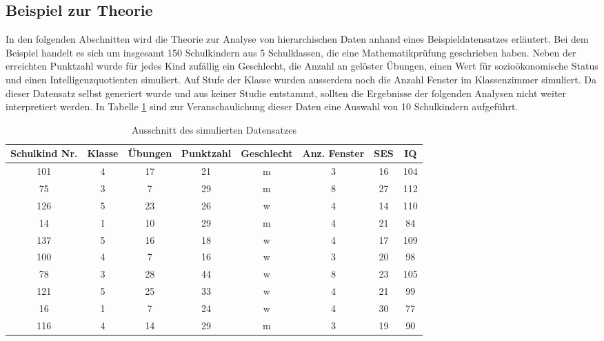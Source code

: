 \documentclass[12pt, a4paper]{article}\usepackage[]{graphicx}\usepackage[]{color}
\begin{document}
\subsection{Beispiel zur Theorie} \label{section:bsp_theorie}
In den folgenden Abschnitten wird die Theorie zur Analyse von hierarchischen Daten anhand eines Beispieldatensatzes erläutert. Bei dem Beispiel handelt es sich um insgesamt 150 Schulkindern aus 5 Schulklassen, die eine Mathematikprüfung geschrieben haben. Neben der erreichten Punktzahl wurde für jedes Kind zufällig ein Geschlecht, die Anzahl an gelöster Übungen, einen Wert für sozioökonomische Status und einen Intelligenzquotienten simuliert. Auf Stufe der Klasse wurden ausserdem noch die Anzahl Fenster im Klassenzimmer simuliert. Da dieser Datensatz selbst generiert wurde und aus keiner Studie entstammt, sollten die Ergebnisse der folgenden Analysen nicht weiter interpretiert werden. In Tabelle \ref{tab:beispiel_theorie} sind zur Veranschaulichung dieser Daten eine Auswahl von 10 Schulkindern aufgeführt.
\begin{table}[t!]
\centering
\begin{threeparttable}
\caption{Ausschnitt des simulierten Datensatzes} 
\begin{tabular}{cccccccc}
  \toprule
 Schulkind Nr. & Klasse & Übungen & Punktzahl & Geschlecht & Anz. Fenster & SES & IQ \\ 
  \midrule
101 & 4 & 17 & 21 & m & 3 & 16 & 104 \\ 
  75 & 3 & 7 & 29 & m & 8 & 27 & 112 \\ 
  126 & 5 & 23 & 26 & w & 4 & 14 & 110 \\ 
  14 & 1 & 10 & 29 & m & 4 & 21 & 84 \\ 
  137 & 5 & 16 & 18 & w & 4 & 17 & 109 \\ 
  100 & 4 & 7 & 16 & w & 3 & 20 & 98 \\ 
  78 & 3 & 28 & 44 & w & 8 & 23 & 105 \\ 
  121 & 5 & 25 & 33 & w & 4 & 21 & 99 \\ 
  16 & 1 & 7 & 24 & w & 4 & 30 & 77 \\ 
  116 & 4 & 14 & 29 & m & 3 & 19 & 90 \\ 
   \bottomrule
\end{tabular}
\label{tab:beispiel_theorie}
\end{threeparttable}
\end{table}
\end{document}
